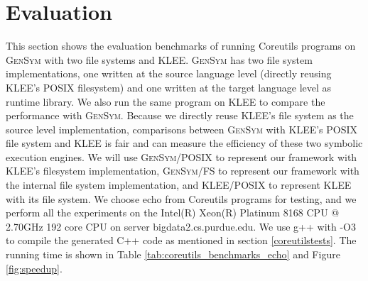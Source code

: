\documentclass[sigplan, nonacm]{acmart}\settopmatter{printfolios=true,printccs=false,printacmref=false}
\newcommand{\tool}{\textsc{GenSym}\xspace}
\begin{document}
\section{Evaluation}\label{evaluation}
This section shows the evaluation benchmarks of running Coreutils programs on \tool with two file systems and KLEE. \tool has two file system implementations, one written at the source language level (directly reusing KLEE's POSIX filesystem) and one written at the target language level as runtime library. We also run the same program on KLEE to compare the performance with \tool. Because we directly reuse KLEE's file system as the source level implementation, comparisons between \tool with KLEE's POSIX file system and KLEE is fair and can measure the efficiency of these two symbolic execution engines. We will use \tool/POSIX to represent our framework with KLEE's filesystem implementation, \tool/FS to represent our framework with the internal file system implementation, and KLEE/POSIX to represent KLEE with its file system. We choose echo from Coreutils programs for testing, and we perform all the experiments on the Intel(R) Xeon(R) Platinum 8168 CPU @ 2.70GHz 192 core CPU on server bigdata2.cs.purdue.edu. We use g++ with -O3 to compile the generated C++ code as mentioned in section \ref{coreutilstests}. The running time is shown in Table \ref{tab:coreutils_benchmarks_echo} and Figure \ref{fig:speedup}.\par
\end{document}
